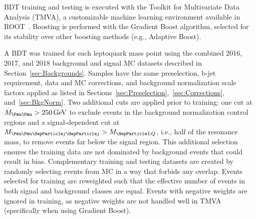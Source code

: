 BDT training and testing is executed with the Toolkit for Multivariate Data Analysis (TMVA), a customizable machine learning environment available in ROOT~\cite{TMVA}. Boosting is performed with the Gradient Boost algorithm, selected for its stability over other boosting methods (e.g., Adaptive Boost). 

A BDT was trained for each leptoquark mass point using the combined 2016, 2017, and 2018 background and signal MC datasets described in Section~\ref{sec:Backgrounds}. Samples have the same preselection, b-jet requirement, data and MC corrections, and background normalization scale factors applied as listed in Sections~\ref{sec:Preselection},~\ref{sec:Corrections}, and~\ref{sec:BkgNorm}. Two additional cuts are applied prior to training: one cut at $\Muu > \SI{250}{\GeV}$ to exclude events in the background normalization control regions and a signal-dependent cut at $\Muujj > \MLQ$, i.e., half of the \HepProcess{\LQ\LQbar} resonance mass, to remove events far below the signal region. This additional selection ensures the training data are not dominated by background events that could result in bias. Complementary training and testing datasets are created by randomly selecting events from MC in a way that forbids any overlap. Events selected for training are reweighted such that the effective number of events in both signal and background classes are equal. Events with negative weights are ignored in training, as negative weights are not handled well in TMVA (specifically when using Gradient Boost). 

